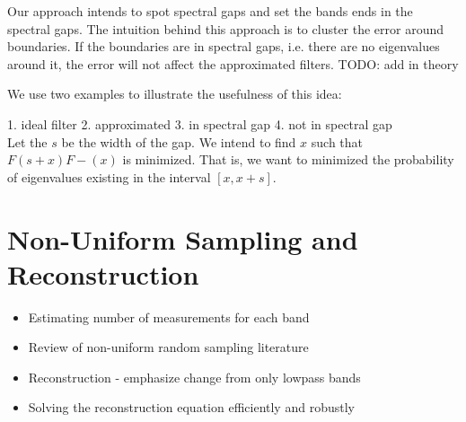\documentclass[a4paper]{article}
\theoremstyle{definition}
\begin{document}
Our approach intends to spot spectral gaps and set the bands ends in the spectral gaps. The intuition behind this approach is to cluster the error around boundaries. If the boundaries are in spectral gaps, i.e. there are no eigenvalues around it, the error will not affect the approximated filters.
TODO: add in theory

We use two examples to illustrate the usefulness of this idea:

1. ideal filter
2. approximated
3. in spectral gap
4. not in spectral gap\\


Let the $s$ be the width of the gap. We intend to find $x$ such that $F(s+x)F-(x)$ is minimized. That is, we want to minimized the probability of eigenvalues existing in the interval $[x, x+s]$.



{\color{blue}
\section{Non-Uniform Sampling and Reconstruction}
\begin{itemize}
\item Estimating number of measurements for each band
\item Review of non-uniform random sampling literature
\item Reconstruction - emphasize change from only lowpass bands
\item {\color{red} Solving the reconstruction equation efficiently and robustly}
\end{itemize}
}
\end{document}
